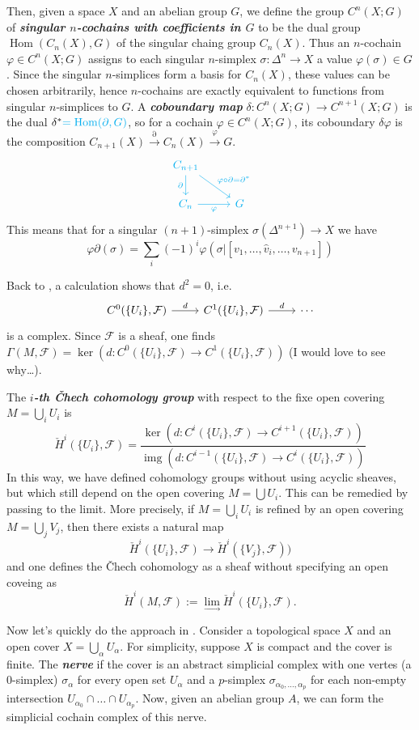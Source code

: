 \documentclass{article}
\newcommand{\Fc}{\mathcal{F}}
\DeclareMathOperator{\img}{img}
\DeclareMathOperator{\Hom}{Hom}
\begin{document}
\begin{remark}
	Then, given a space $X$ and an abelian group $G$, we define the group $C^n(X;G)$ of \textbf{\textit{singular $n$-cochains with coefficients in $G$}} to be the dual group $\Hom(C_n(X),G)$ of the singular chaing group $C_n(X)$. Thus an $n$-cochain $\varphi\in C^n(X;G)$ assigns to each singular $n$-simplex $\sigma:\Delta^n\to X$ a value $\varphi(\sigma)\in G$. Since the singular $n$-simplices form a basis for $C_n(X)$, these values can be chosen arbitrarily, hence $n$-cochains are exactly equivalent to functions from singular $n$-simplices to $G$. A \textbf{\textit{coboundary map}} $\delta:C^n(X;G)\to C^{n+1}(X;G)$ is the dual $\delta^*{\color{cyan}=\Hom(\partial,G)}$, so for a cochain $\varphi\in C^n(X;G)$, its coboundary $\delta\varphi$ is the composition $C_{n+1}(X)\overset{\partial}{\to}C_n(X)\overset{\varphi}{\to}G$.
		\[\begin{tikzcd}
		\textcolor{cyan}{C_{n+1}}\arrow[d,cyan,swap,"\partial"]\arrow[rd,cyan,"\varphi\circ\partial=\partial^*"]\\	\textcolor{cyan}{C_n}\arrow[cyan,swap,r,"\varphi"]&\textcolor{cyan}{G}
	\end{tikzcd}\]
	This means that for a singular $(n+1)$-simplex $\sigma(\Delta^{n+1})\to X$ we have
	\[\varphi\partial (\sigma)=\sum_i(-1)^i\varphi(\sigma|[v_1,\ldots,\widehat{v}_i,\ldots,v_{n+1}])\]
\end{remark}

Back to \cite{huybrechts}, a calculation shows that $d^2=0$, i.e.
\[\begin{tikzcd}
	C^0(\{U_i\},\Fc)\arrow[r,"d"]&C^1(\{U_i\},\Fc)\arrow[r,"d"]&\cdots
\end{tikzcd}\]
is a complex. {\color{magenta}Since $\Fc$ is a sheaf, one finds $\Gamma(M,\Fc)=\ker(d:C^0(\{U_i\},\Fc)\to C^1(\{U_i\},\Fc))$ (I would love to see why…)}.

\begin{defn}
	The \textbf{\textit{$i$-th \v Chech cohomology group}} with respect to the fixe open covering $M=\bigcup_iU_i$ is
	\[\check{H}^i(\{U_i\},\Fc)=\dfrac{\ker(d:C^i(\{U_i\},\Fc)\to C^{i+1}(\{U_i\},\Fc))}{\img(d:C^{i-1}(\{U_i\},\Fc)\to C^i(\{U_i\},\Fc))}\]
	In this way, we have defined cohomology groups without using acyclic sheaves, but which still depend on the open covering $M=\bigcup U_i$. This can be remedied by passing to the limit. More precisely, if $M=\bigcup_i U_i$ is refined by an open covering $M=\bigcup_jV_j$, then there exists a natural map
	\[\check{H}^i(\{U_i\},\Fc)\to\check{H}^i(\{V_j\},\Fc))\]
	and one defines the \v Chech cohomology as a sheaf without specifying an open coveing as
	\[\check{H}^i(M,\Fc):=\lim_\to \check{H}^i(\{U_i\},\Fc).\]
\end{defn}
Now let's quickly do the approach in \cite{donaldson}.
Consider a topological space $X$ and an open cover $X=\bigcup_\alpha U_\alpha$. For simplicity, suppose $X$ is compact and the cover is finite. The \textbf{\textit{nerve}} if the cover is an abstract simplicial complex with one vertes (a 0-simplex) $\sigma_\alpha$ for every open set $U_\alpha$ and a $p$-simplex $\sigma_{\alpha_0,\ldots,\alpha_p}$ for each non-empty intersection $U_{\alpha_0}\cap\ldots\cap U_{\alpha_p}$. Now, given an abelian group $A$, we can form the simplicial cochain complex of this nerve.
\end{document}

